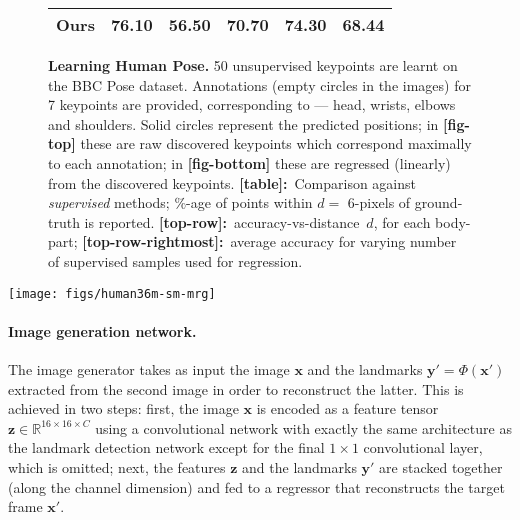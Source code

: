 \documentclass{article}
\newcommand{\bx}{\mathbf{x}}
\newcommand{\by}{\mathbf{y}}
\newcommand{\bz}{\mathbf{z}}
\begin{document}
\begin{figure}[t!]
\begin{minipage}{\textwidth}
\begin{minipage}[b]{0.47\textwidth}
{\begin{tabular}{@{}llllll@{}}
Ours            & 76.10                    & 56.50                      & 70.70                      & 74.30                         & 68.44
\\ \bottomrule
\end{tabular}}
    \captionsetup[table]{labelformat=empty}
    \captionsetup[table]{labelformat=empty}
  \end{minipage}
\end{minipage}
\caption{{\bf Learning Human Pose.} 50 unsupervised keypoints are learnt on the
         BBC Pose dataset. Annotations (empty circles in the images) for 7
         keypoints are provided, corresponding to --- head, wrists, elbows and shoulders.
         Solid circles represent the predicted positions;
         in {\bf [fig-top]} these are raw discovered keypoints which correspond
         maximally to each annotation; in {\bf [fig-bottom]} these are regressed
         (linearly) from the discovered keypoints.
        {\bf [table]:}~Comparison against \emph{supervised} methods;
        $\%$-age of points within $d{=}$ 6-pixels of ground-truth is reported.
        {\bf [top-row]:}~accuracy-vs-distance~$d$, for each body-part;
        {\bf [top-row-rightmost]:}~average accuracy for varying number of supervised samples used for regression.}\label{fig:bbc-paper}%
\end{figure}\begin{figure*}[b]
\centering
\texttt{[image: figs/human36m-sm-mrg]}
\caption{{\bf Unsupervised Landmarks on Human3.6M.} {\bf [left]:} an example quadruplet source-target-reconstruction-keypoint (left to right) from Human3.6M. {\bf [right]:} learned keypoints on a test video sequence. The landmarks consistently track the legs, arms, torso and head across frames.}\label{fig:human36m}
\label{fig:human36m}
\end{figure*}\paragraph{Image generation network.}


The image generator takes as input the image $\bx$ and the landmarks $\by' = \Phi(\bx')$ extracted from the second image in order to reconstruct the latter. This is achieved in two steps: first, the image $\bx$ is encoded as a feature tensor $\bz \in \mathbb{R}^{16\times 16\times C}$ using a convolutional network with exactly the same architecture as the landmark detection network except for the final $1{\times}1$ convolutional layer, which is omitted; next, the features $\bz$ and the landmarks $\by'$ are stacked together (along the channel dimension) and fed to a regressor that reconstructs the target frame $\bx'$.
\end{document}
